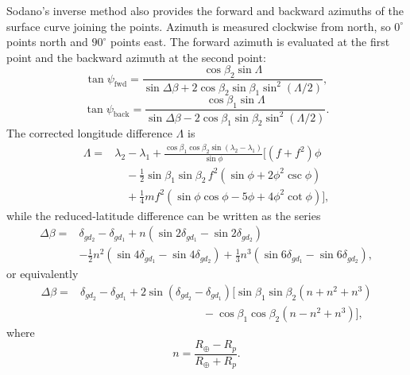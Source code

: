 Sodano's inverse method also provides the forward and backward azimuths of the
surface curve joining the points. Azimuth is measured clockwise from north, so
$0^\circ$ points north and $90^\circ$ points east. The forward azimuth is evaluated
at the first point and the backward azimuth at the second point:
\begin{equation}
  \tan\psi_{\mathrm{fwd}}
  =\frac{\cos\beta_2\sin\Lambda}
         {\sin\Delta\beta
          +2\cos\beta_2\sin\beta_1\sin^2(\Lambda/2)},
  \label{eq:sodano-forward-azimuth}
\end{equation}
\begin{equation}
  \tan\psi_{\mathrm{back}}
  =\frac{\cos\beta_1\sin\Lambda}
         {\sin\Delta\beta
          -2\cos\beta_1\sin\beta_2\sin^2(\Lambda/2)}.
  \label{eq:sodano-backward-azimuth}
\end{equation}
The corrected longitude difference $\Lambda$ is
\begin{equation}
\begin{aligned}
\Lambda={}&\lambda_2-\lambda_1
 +\frac{\cos\beta_1\cos\beta_2\sin(\lambda_2-\lambda_1)}{\sin\phi}
 \Bigg[(f+f^2)\phi\\
&\quad-\frac12\sin\beta_1\sin\beta_2\,f^2
       \left(\sin\phi+2\phi^2\csc\phi\right)\\
&\quad+\frac14m f^2
       \left(\sin\phi\cos\phi-5\phi+4\phi^2\cot\phi\right)
 \Bigg],
\end{aligned}
\label{eq:sodano-corrected-longitude-difference}
\end{equation}
while the reduced-latitude difference can be written as the series
\begin{equation}
\begin{aligned}
\Delta\beta={}&\delta_{gd_2}-\delta_{gd_1}
+n\left(\sin2\delta_{gd_1}-\sin2\delta_{gd_2}\right)\\
&-\frac12n^2\left(\sin4\delta_{gd_1}-\sin4\delta_{gd_2}\right)
+\frac13n^3\left(\sin6\delta_{gd_1}-\sin6\delta_{gd_2}\right),
\end{aligned}
\label{eq:sodano-delta-beta-series}
\end{equation}
or equivalently
\begin{equation}
\begin{aligned}
\Delta\beta={}&\delta_{gd_2}-\delta_{gd_1}
+2\sin(\delta_{gd_2}-\delta_{gd_1})
 \Big[\sin\beta_1\sin\beta_2(n+n^2+n^3)\\
&\hspace{11em}-\cos\beta_1\cos\beta_2(n-n^2+n^3)\Big],
\end{aligned}
\label{eq:sodano-delta-beta-alternative}
\end{equation}
where
\begin{equation}
  n=\frac{R_{\oplus}-R_p}{R_{\oplus}+R_p}.
  \label{eq:sodano-flattening-n}
\end{equation}

